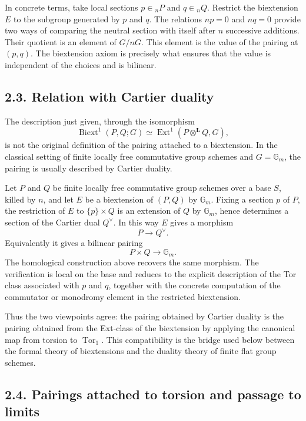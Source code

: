 \documentclass[11pt]{article}
\newcommand{\bL}{\mathbf L}
\newcommand{\Gm}{\mathbb G_m}
\newcommand{\Ext}{\operatorname{Ext}}
\newcommand{\Tor}{\operatorname{Tor}}
\newcommand{\Biext}{\operatorname{Biext}}
\begin{document}
In concrete terms, take local sections \(p\in {}_nP\) and \(q\in {}_nQ\).
Restrict the biextension \(E\) to the subgroup generated by \(p\) and \(q\). The
relations \(np=0\) and \(nq=0\) provide two ways of comparing the neutral section
with itself after \(n\) successive additions. Their quotient is an element of
\(G/nG\). This element is the value of the pairing at \((p,q)\). The
biextension axiom is precisely what ensures that the value is independent of the
choices and is bilinear.

\subsection*{2.3. Relation with Cartier duality}

The description just given, through the isomorphism
\[
\Biext^1(P,Q;G)\simeq \Ext^1(P\otimes^{\bL}Q,G),
\]
is not the original definition of the pairing attached to a biextension. In the
classical setting of finite locally free commutative group schemes and
\(G=\Gm\), the pairing is usually described by Cartier duality.

Let \(P\) and \(Q\) be finite locally free commutative group schemes over a base
\(S\), killed by \(n\), and let \(E\) be a biextension of \((P,Q)\) by
\(\Gm\). Fixing a section \(p\) of \(P\), the restriction of \(E\) to
\(\{p\}\times Q\) is an extension of \(Q\) by \(\Gm\), hence determines a section
of the Cartier dual \(Q^\vee\). In this way \(E\) gives a morphism
\[
P\longrightarrow Q^\vee.
\]
Equivalently it gives a bilinear pairing
\[
P\times Q\longrightarrow \Gm.
\]
The homological construction above recovers the same morphism. The verification
is local on the base and reduces to the explicit description of the Tor class
associated with \(p\) and \(q\), together with the concrete computation of the
commutator or monodromy element in the restricted biextension.

Thus the two viewpoints agree: the pairing obtained by Cartier duality is the
pairing obtained from the Ext-class of the biextension by applying the canonical
map from torsion to \(\Tor_1\). This compatibility is the bridge used below
between the formal theory of biextensions and the duality theory of finite flat
group schemes.


\subsection*{2.4. Pairings attached to torsion and passage to limits}
\end{document}
